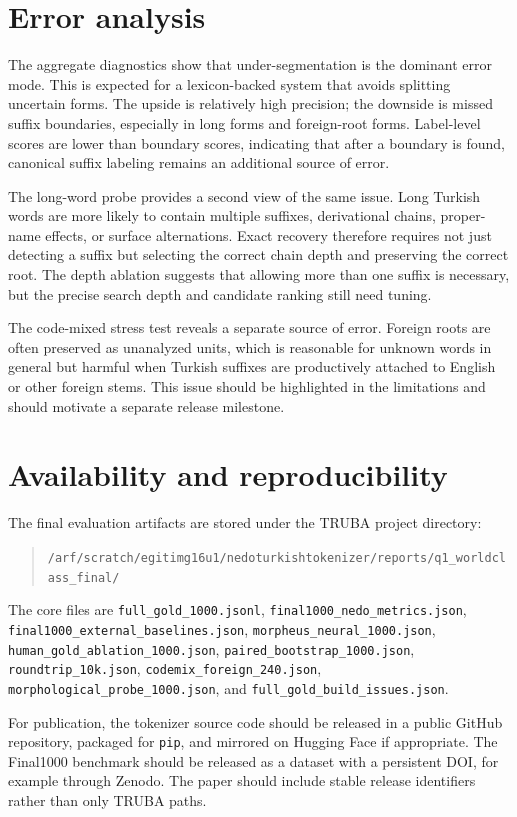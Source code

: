 \documentclass[11pt]{article}
\begin{document}
\section{Error analysis}
The aggregate diagnostics show that under-segmentation is the dominant error mode. This is expected for a lexicon-backed system that avoids splitting uncertain forms. The upside is relatively high precision; the downside is missed suffix boundaries, especially in long forms and foreign-root forms. Label-level scores are lower than boundary scores, indicating that after a boundary is found, canonical suffix labeling remains an additional source of error.

The long-word probe provides a second view of the same issue. Long Turkish words are more likely to contain multiple suffixes, derivational chains, proper-name effects, or surface alternations. Exact recovery therefore requires not just detecting a suffix but selecting the correct chain depth and preserving the correct root. The depth ablation suggests that allowing more than one suffix is necessary, but the precise search depth and candidate ranking still need tuning.

The code-mixed stress test reveals a separate source of error. Foreign roots are often preserved as unanalyzed units, which is reasonable for unknown words in general but harmful when Turkish suffixes are productively attached to English or other foreign stems. This issue should be highlighted in the limitations and should motivate a separate release milestone.

\section{Availability and reproducibility}
The final evaluation artifacts are stored under the TRUBA project directory:
\begin{quote}
\texttt{/arf/scratch/egitimg16u1/nedoturkishtokenizer/reports/q1\_worldclass\_final/}
\end{quote}
The core files are \texttt{full\_gold\_1000.jsonl}, \texttt{final1000\_nedo\_metrics.json}, \texttt{final1000\_external\_baselines.json}, \texttt{morpheus\_neural\_1000.json}, \texttt{human\_gold\_ablation\_1000.json}, \texttt{paired\_bootstrap\_1000.json}, \texttt{roundtrip\_10k.json}, \texttt{codemix\_foreign\_240.json}, \texttt{morphological\_probe\_1000.json}, and \texttt{full\_gold\_build\_issues.json}.

For publication, the tokenizer source code should be released in a public GitHub repository, packaged for \texttt{pip}, and mirrored on Hugging Face if appropriate. The Final1000 benchmark should be released as a dataset with a persistent DOI, for example through Zenodo. The paper should include stable release identifiers rather than only TRUBA paths.
\end{document}
